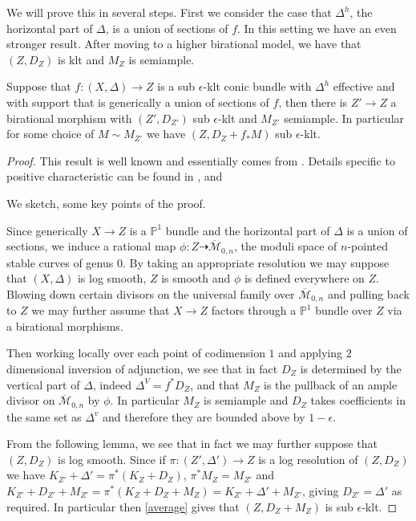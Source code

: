 We will prove this in several steps. First we consider the case that $\Delta^{h}$, the horizontal part of $\Delta$, is a union of sections of $f$. In this setting we have an even stronger result. After moving to a higher birational model, we have that $(Z,D_{Z})$ is klt and $M_{Z}$ is semiample.

\begin{lemma}\label{ShokurovAdjunction}
	Suppose that $f\colon (X,\Delta) \to Z$ is a sub $\epsilon$-klt conic bundle with $\Delta^{h}$ effective and with support that is generically a union of sections of $f$, then there is $Z'\to Z$ a birational morphism with $(Z',D_{Z'})$ sub $\epsilon$-klt and $M_{Z'}$ semiample. In particular for some choice of $M\sim M_{Z'}$ we have $(Z,D_{Z}+f_{*}M)$ sub $\epsilon$-klt. 
\end{lemma}
\begin{proof}
	This result is well known and essentially comes from \cite{prokhorov2009towards}. Details specific to positive characteristic can be found in \cite[Section 4]{das2016adjunction}, \cite[Lemma 3.1]{witaszek2017canonical} and \cite[Lemma 6.7]{cascini2013base}
	
	We sketch, some key points of the proof.
	
	Since generically $X \to Z$ is a $\mathbb{P}^{1}$ bundle and the horizontal part of $\Delta$ is a union of sections, we induce a rational map $\phi\colon Z \dashrightarrow \overline{\mathcal{M}}_{0, n}$, the moduli space of $n$-pointed stable curves of genus $0$. By taking an appropriate resolution we may suppose that $(X,\Delta)$ is log smooth, $Z$ is smooth and $\phi$ is defined everywhere on $Z$. Blowing down certain divisors on the universal family over $\overline{\mathcal{M}}_{0, n}$ and pulling back to $Z$ we may further assume that $X\to Z$ factors through a $\mathbb{P}^{1}$ bundle over $Z$ via a birational morphisms.
	
	Then working locally over each point of codimension $1$ and applying $2$ dimensional inversion of adjunction, we see that in fact $D_{Z}$ is determined by the vertical part of $\Delta$, indeed $\Delta^{V}=f^{*}D_{Z}$, and that $M_{Z}$ is the pullback of an ample divisor on $\overline{\mathcal{M}}_{0, n}$ by $\phi$. In particular $M_{Z}$ is semiample and $D_{Z}$ takes coefficients in the same set as $\Delta^{v}$ and therefore they are bounded above by $1-\epsilon$.
	
	From the following lemma, we see that in fact we may further suppose that $(Z,D_{Z})$ is log smooth. Since if $\pi\colon (Z',\Delta')\to Z$ is a log resolution of $(Z,D_{Z})$ we have $K_{Z'}+\Delta'=\pi^{*}(K_{Z}+D_{Z})$, $\pi^{*}M_{Z}=M_{Z'}$ and $K_{Z'}+D_{Z'}+M_{Z'}=\pi^{*}(K_{Z}+D_{Z}+M_{Z})=K_{Z'}+\Delta'+M_{Z'}$, giving $D_{Z'}=\Delta'$ as required. In particular then \autoref{average} gives that $(Z,D_{Z}+M_{Z})$ is sub $\epsilon$-klt. 
\end{proof}

